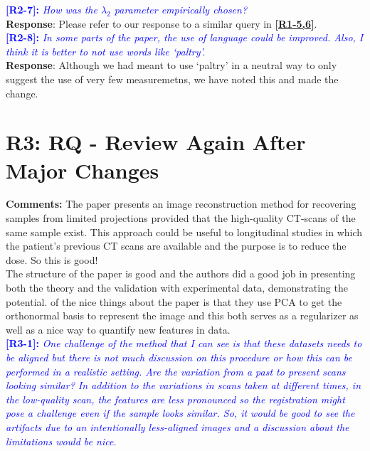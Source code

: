 \documentclass[11pt]{article}
\begin{document}
\vspace{0.5cm}\textcolor{blue}{\textbf{[R2-7]:} \textit{How was the $\lambda_2$ parameter empirically chosen?
}}\\

\textbf{Response}: Please refer to our response to a similar query in \textcolor{blue}{\textbf{\hyperlink{hyperparameters}{[R1-5,6]}}}.\\

\vspace{0.5cm}\textcolor{blue}{\textbf{[R2-8]:} \textit{In some parts of the paper, the use of language could be improved. Also, I think it is better to not use words like `paltry'.}}\\

\textbf{Response}: Although we had meant to use `paltry' in a neutral way to only suggest the use of very few measuremetns, we  have noted this and made the change.\\

\section{R3: RQ - Review Again After Major Changes}

\textbf{Comments:} The paper presents an image reconstruction method for recovering samples from limited projections provided that the high-quality CT-scans of the same sample exist. This approach could be useful to longitudinal studies in which the patient's previous CT scans are available and the purpose is to reduce the dose. So this is good!\\

The structure of the paper is good and the authors did a good job in presenting both the theory and the validation with experimental data, demonstrating the potential. of the nice things about the paper is that they use PCA to get the orthonormal basis to represent the image and this both serves as a regularizer as well as a nice way to quantify new features in data.
\\

\vspace{0.5cm}\textcolor{blue}{\textbf{[R3-1]:} \textit{One challenge of the method that I can see is that these datasets needs to be aligned but there is not much discussion on this procedure or how this can be performed in a realistic setting. Are the variation from a past to present scans looking similar? In addition to the variations in scans taken at different times, in the low-quality scan, the features are less pronounced so the registration might pose a challenge even if the sample looks similar. So, it would be good to see the artifacts due to an intentionally less-aligned images and a discussion about the limitations would be nice.
}}\\
\end{document}
